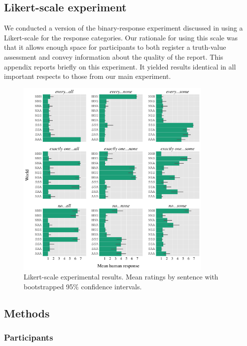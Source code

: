 \documentclass[leqno,12pt]{article}
\begin{document}
\begin{appendix}

\section{Likert-scale experiment}\label{app:likert}

We conducted a version of the binary-response experiment discussed in
 using a Likert-scale for the response categories.
Our rationale for using this scale was that it allows enough space for
participants to both register a truth-value assessment and convey
information about the quality of the report. This appendix reports
briefly on this experiment. It yielded results identical in all
important respects to those from our main experiment.

\begin{figure}[t]
  \centering
  \includegraphics[width=0.85\textwidth]{fig/basketball-pilot-2-11-14-results-parsed}
  \caption{Likert-scale experimental results. Mean ratings by sentence with bootstrapped 95\% confidence intervals.}
  \label{fig:likert:results}
\end{figure}

\subsection{Methods}

\subsubsection{Participants}


\end{appendix}
\end{document}
